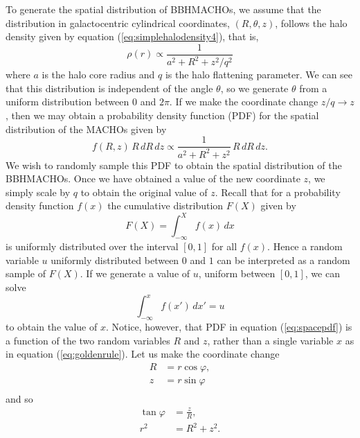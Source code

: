 To generate the spatial distribution of BBHMACHOs, we assume that the
distribution in galactocentric cylindrical coordinates, $(R,\theta,z)$,
follows the halo density given by equation (\ref{eq:simplehalodensity4}),
that is,
\begin{equation}
\rho(r) \propto \frac{1}{a^2 + R^2 + z^2/q^2}
\end{equation}
where $a$ is the halo core radius and $q$ is the halo flattening parameter. We
can see that this distribution is independent of the angle $\theta$, so we
generate $\theta$ from a uniform distribution between $0$ and $2\pi$.  If
we make the coordinate change $z/q \rightarrow z$, then we may obtain a
probability density function (PDF) for the spatial distribution of
the MACHOs given by
\begin{equation}
f(R,z)\,R\, dR\, dz \propto \frac{1}{a^2 + R^2 + z^2}\,R\, dR\, dz.
\label{eq:spacepdf}
\end{equation}
We wish to randomly sample this PDF to obtain the spatial distribution of
the BBHMACHOs. Once we have obtained a value of the new coordinate $z$, we
simply scale by $q$ to obtain the original value of $z$. Recall that for a
probability density function $f(x)$ the cumulative distribution $F(X)$
given by
\begin{equation}
F(X) = \int_{-\infty}^X f(x)\, dx
\end{equation}
is uniformly distributed over the interval $[0,1]$ for all $f(x)$. Hence a
random variable $u$ uniformly distributed between $0$ and $1$ can be
interpreted as a random sample of $F(X)$. If we generate a value of $u$,
uniform between $[0,1]$, we can solve 
\begin{equation}
\int_{-\infty}^x f(x')\, dx' = u
\label{eq:goldenrule}
\end{equation}
to obtain the value of $x$. Notice, however, that PDF in equation
(\ref{eq:spacepdf}) is a function of the two random variables $R$ and $z$,
rather than a single variable $x$ as in equation (\ref{eq:goldenrule}).
Let us make the coordinate change
\begin{equation}
\begin{split}
R &= r \cos \varphi, \\
z &= r \sin \varphi \\
\label{eq:probcoordtrans}
\end{split}
\end{equation}
and so
\begin{equation}
\begin{split}
\tan \varphi &= \frac{z}{R}, \\
r^2 &= R^2 + z^2. \\
\end{split}
\end{equation}
